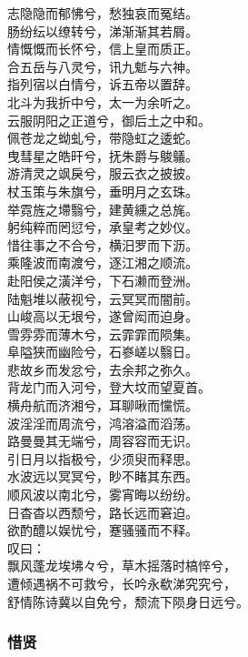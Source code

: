 \documentclass[]{article}
\begin{document}
志隐隐而郁怫兮，愁独哀而冤结。\\
肠纷纭以缭转兮，涕渐渐其若屑。\\
情慨慨而长怀兮，信上皇而质正。\\
合五岳与八灵兮，讯九鬿与六神。\\
指列宿以白情兮，诉五帝以置辞。\\
北斗为我折中兮，太一为余听之。\\
云服阴阳之正道兮，御后土之中和。\\
佩苍龙之蚴虬兮，带隐虹之逶蛇。\\
曳彗星之皓旰兮，抚朱爵与鵔鸃。\\
游清灵之飒戾兮，服云衣之披披。\\
杖玉策与朱旗兮，垂明月之玄珠。\\
举霓旌之墆翳兮，建黄纁之总旄。\\
躬纯粹而罔愆兮，承皇考之妙仪。\\
惜往事之不合兮，横汨罗而下沥。\\
乘隆波而南渡兮，逐江湘之顺流。\\
赴阳侯之潢洋兮，下石濑而登洲。\\
陆魁堆以蔽视兮，云冥冥而闇前。\\
山峻高以无垠兮，遂曾闳而迫身。\\
雪雰雰而薄木兮，云霏霏而陨集。\\
阜隘狭而幽险兮，石嵾嵯以翳日。\\
悲故乡而发忿兮，去余邦之弥久。\\
背龙门而入河兮，登大坟而望夏首。\\
横舟航而济湘兮，耳聊啾而戃慌。\\
波淫淫而周流兮，鸿溶溢而滔荡。\\
路曼曼其无端兮，周容容而无识。\\
引日月以指极兮，少须臾而释思。\\
水波远以冥冥兮，眇不睹其东西。\\
顺风波以南北兮，雾宵晦以纷纷。\\
日杳杳以西颓兮，路长远而窘迫。\\
欲酌醴以娱忧兮，蹇骚骚而不释。\\
叹曰：\\
飘风蓬龙埃坲々兮，草木摇落时槁悴兮，\\
遭倾遇祸不可救兮，长吟永欷涕究究兮，\\
舒情陈诗冀以自免兮，颓流下陨身日远兮。

\hypertarget{header-n3102}{%
\subsubsection{惜贤}\label{header-n3102}}
\end{document}
